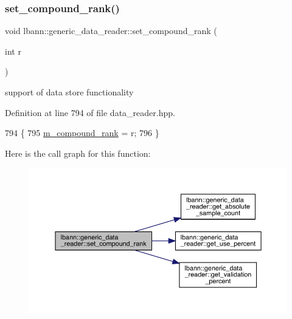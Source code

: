 \subsubsection{\texorpdfstring{set\+\_\+compound\+\_\+rank()}{set\_compound\_rank()}}
{\footnotesize\ttfamily void lbann\+::generic\+\_\+data\+\_\+reader\+::set\+\_\+compound\+\_\+rank (\begin{DoxyParamCaption}\item[{int}]{r }\end{DoxyParamCaption})\hspace{0.3cm}{\ttfamily [inline]}}



support of data store functionality 



Definition at line 794 of file data\+\_\+reader.\+hpp.


\begin{DoxyCode}
794                                 \{
795     \hyperlink{classlbann_1_1generic__data__reader_a7df02a1534b100df6f718dc7a7b32b25}{m\_compound\_rank} = r;
796   \}
\end{DoxyCode}
Here is the call graph for this function\+:\nopagebreak
\begin{figure}[H]
\begin{center}
\leavevmode
\includegraphics[width=350pt]{classlbann_1_1generic__data__reader_a960362f819312d39dfcba5eeecf76257_cgraph}
\end{center}
\end{figure}
\mbox{\label{classlbann_1_1generic__data__reader_a74b7ef4fe0dc7d3a96868ca3b5fbf897}} 
